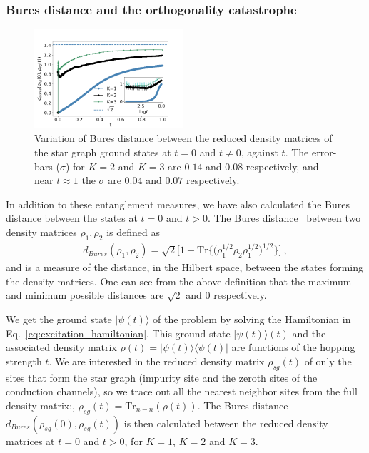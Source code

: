 \documentclass{iopart}
\begin{document}
\subsubsection{Bures distance and the orthogonality catastrophe}
\begin{figure}[!htpb]
\includegraphics[width=0.49\textwidth]{errorBuresDistanceCh12310001}
\caption{Variation of Bures distance between the reduced density matrices of the star graph ground states at $t=0$ and $t\neq 0$, against $t$. The error-bars ($\sigma$) for \(K=2\) and \(K=3\) are $0.14$ and $0.08$ respectively, and near $t\approx 1$ the $\sigma$ are $0.04$ and $0.07$ respectively.}
\label{fig:bures_distance}
\end{figure}
In addition to these entanglement measures, we have also calculated the Bures distance between the states at \(t=0\) and \(t>0\). The Bures distance~\cite{uhlmann1976transition,bures1969extension,hubner1992explicit,hubner1993computation,dittmann1994some,marian2003bures} between two density matrices \(\rho_1,\rho_2\) is defined as 
\begin{eqnarray}
d_{Bures}(\rho_1,\rho_2) = \sqrt{2} \bigg[1- \textrm{Tr}\bigg\{ \bigg(\rho_1^{1/2}  \rho_2 \rho_{1}^{1/2}\bigg)^{1/2} \bigg\}\bigg]~,
\end{eqnarray}
and is a measure of the distance, in the Hilbert space, between the states forming the density matrices. One can see from the above definition that the maximum and minimum possible distances are $\sqrt{2}$ and $0$ respectively.
\par We get the ground state $|\psi(t)\rangle$ of the problem by solving the Hamiltonian in Eq.~\eqref{eq:excitation_hamiltonian}. This ground state $|\psi(t)\rangle(t)$ and the associated density matrix $\rho(t)= |\psi(t)\rangle \langle \psi(t)|$ are functions of the hopping strength \(t\). We are interested in the reduced density matrix $\rho_{sg}(t)$ of only the sites that form the star graph (impurity site and the zeroth sites of the conduction channels), so we trace out all the nearest neighbor sites from the full density matrix:, $\rho_{sg}(t)=\textrm{Tr}_{n-n}(\rho(t))$. The Bures distance $d_{Bures}(\rho_{sg}(0),\rho_{sg}(t))$ is then calculated between the reduced density matrices at \(t=0\) and \(t > 0\), for \(K=1\), \(K=2\) and \(K=3\).
\end{document}
